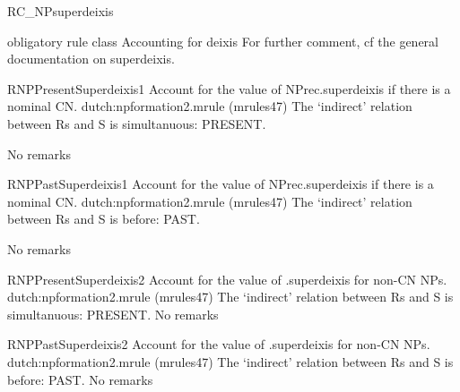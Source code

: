 \begin{mruleclass}{RC\_NPsuperdeixis}
\begin{classdescr}
\kind obligatory rule class
\classtask Accounting for deixis
\classremarks For further comment, cf the general documentation on superdeixis.
\nofilters
\nospeedrules
\noplannedrules
\norulesnotince
\begin{comments}
\end{comments}
\end{classdescr}

\begin{members}
\begin{member}
 RNPPresentSuperdeixis1
 Account for the value of NPrec.superdeixis if there is a nominal CN.
\file dutch:npformation2.mrule (mrules47)
\semantics The `indirect' relation between Rs and S is simultanuous: PRESENT.

\example
\remarks No remarks
\end{member}
\begin{member}
 RNPPastSuperdeixis1
 Account for the value of NPrec.superdeixis if there is a nominal CN.
\file dutch:npformation2.mrule (mrules47)
\semantics The `indirect' relation between Rs and S is before: PAST.

\example
\remarks No remarks
\end{member}
\begin{member}
 RNPPresentSuperdeixis2
 Account for the value of .superdeixis for non-CN NPs.
\file dutch:npformation2.mrule (mrules47)
\semantics The `indirect' relation between Rs and S is simultanuous: PRESENT.
\example
\remarks No remarks
\end{member}
\begin{member}
 RNPPastSuperdeixis2
 Account for the value of .superdeixis for non-CN NPs.
\file dutch:npformation2.mrule (mrules47)
\semantics The `indirect' relation between Rs and S is before: PAST.
\example
\remarks No remarks
\end{member}
\end{members}
\end{mruleclass}

